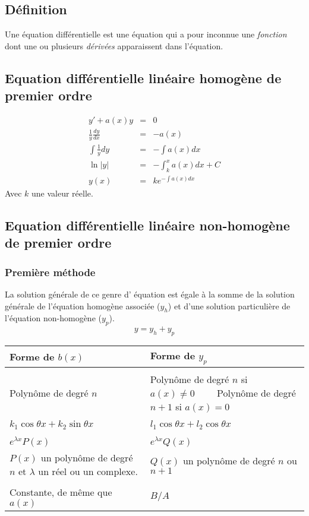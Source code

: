 	

\subsection{Définition}
Une équation différentielle est une équation qui a pour inconnue une \emph{fonction} dont une ou plusieurs \emph{dérivées} apparaissent dans l'équation.
\subsection[Linéaire homogène de premier ordre]{Equation différentielle linéaire homogène de premier ordre}
\begin{eqnarray*}
y' +a(x)y &=& 0\\
\frac{1}{y}\frac{dy}{dx} &=& -a(x)\\
\int{ \frac{1}{y} dy}&=& - \int{a(x) dx}\\
\ln{|y|} &=& - \int_k^x{a(x) dx} + C\\
y(x) &=& ke^{-\int{a(x) dx}}
\end{eqnarray*}
Avec $k$ une valeur réelle.
\subsection[Linéaire non-homogène de premier ordre]{Equation différentielle linéaire non-homogène de premier ordre}
\subsubsection{Première méthode}
La solution générale de ce genre d' équation est égale à la somme de la solution générale de l'équation homogène associée ($y_h$) et d'une solution particulière de l'équation non-homogène ($y_p$).
\[y = y_h + y_p\]
\begin{center}
\begin{tabular}{p{6cm}|p{6cm}}
\textbf{Forme de $b(x)$}&\textbf{Forme de $y_p$}\\
\hline\\
Polynôme de degré $n$&Polynôme de degré $n$ si $a(x) \neq 0 \qquad$ Polynôme de degré $n+1$ si $a(x) = 0$\\
&\\
$k_1\cos{\theta}x + k_2\sin{\theta}x$&$l_1\cos{\theta}x + l_2\cos{\theta}x$\\
&\\
$e^{\lambda{x}}P(x)$&$e^{\lambda{x}}Q(x)$\\
$P(x)$ un polynôme de degré $n$ et $\lambda$ un réel ou un complexe.&$Q(x)$ un polynôme de degré $n$ ou $n + 1$\\
&\\
Constante, de même que $a(x)$&$B/A$
\end{tabular}
\end{center}
